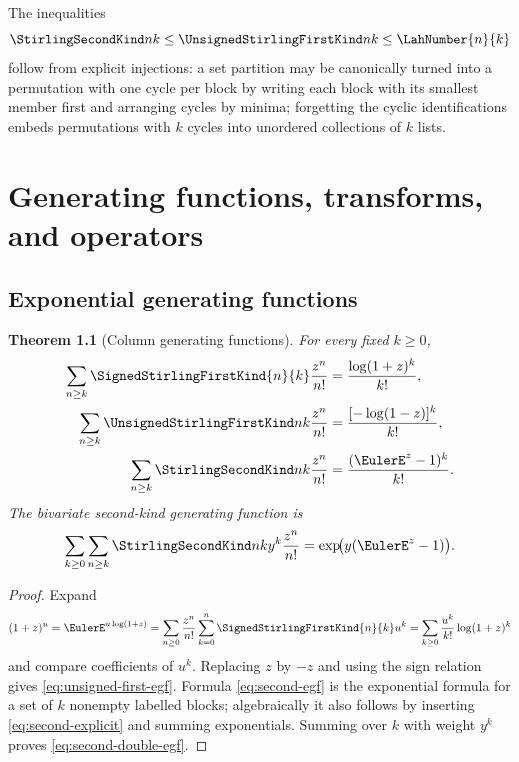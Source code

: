\documentclass[11pt,a4paper,oneside,openany]{book}
\newtheorem{theorem}{Theorem}[chapter]
\theoremstyle{definition}
\theoremstyle{remark}
\begin{document}
The inequalities
\begin{equation}\label{eq:stirling-lah-ineq}
 \StirlingSecondKind nk\le\UnsignedStirlingFirstKind nk\le \LahNumber{n}{k}
\end{equation}
follow from explicit injections: a set partition may be canonically turned into a
permutation with one cycle per block by writing each block with its smallest member
first and arranging cycles by minima; forgetting the cyclic identifications embeds
permutations with $k$ cycles into unordered collections of $k$ lists.


\chapter{Generating functions, transforms, and operators}
\label{ch:stirling-gf}

\section{Exponential generating functions}
\begin{theorem}[Column generating functions]\label{thm:stirling-egfs}
For every fixed $k\ge0$,
\begin{align}
 \sum_{n\ge k}\SignedStirlingFirstKind{n}{k}\frac{z^n}{n!}
   &=\frac{\log(1+z)^k}{k!},\label{eq:signed-first-egf}\\
 \sum_{n\ge k}\UnsignedStirlingFirstKind nk\frac{z^n}{n!}
   &=\frac{[-\log(1-z)]^k}{k!},\label{eq:unsigned-first-egf}\\
 \sum_{n\ge k}\StirlingSecondKind nk\frac{z^n}{n!}
   &=\frac{(\EulerE^z-1)^k}{k!}.\label{eq:second-egf}
\end{align}
The bivariate second-kind generating function is
\begin{equation}\label{eq:second-double-egf}
 \sum_{k\ge0}\sum_{n\ge k}\StirlingSecondKind nk y^k\frac{z^n}{n!}
 =\exp\!\bigl(y(\EulerE^z-1)\bigr).
\end{equation}
\end{theorem}
\begin{proof}
Expand
\[
 (1+z)^u=\EulerE^{u\log(1+z)}
 =\sum_{n\ge0}\frac{z^n}{n!}\sum_{k=0}^n\SignedStirlingFirstKind{n}{k}u^k
 =\sum_{k\ge0}\frac{u^k}{k!}\log(1+z)^k
\]
and compare coefficients of $u^k$.  Replacing $z$ by $-z$ and using the sign
relation gives \cref{eq:unsigned-first-egf}.  Formula \cref{eq:second-egf} is the
exponential formula for a set of $k$ nonempty labelled blocks; algebraically it also
follows by inserting \cref{eq:second-explicit} and summing exponentials.  Summing over
$k$ with weight $y^k$ proves \cref{eq:second-double-egf}.
\end{proof}
\end{document}
